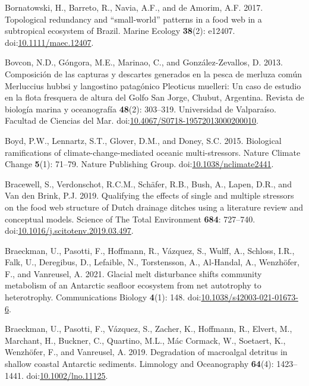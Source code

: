 \documentclass[
]{article}
\newlength{\cslhangindent}
\newenvironment{CSLReferences}[2] %
 {\begin{list}{}{%
  \setlength{\itemindent}{0pt}
  \setlength{\leftmargin}{0pt}
  \setlength{\parsep}{0pt}
  \ifodd #1
   \setlength{\leftmargin}{\cslhangindent}
   \setlength{\itemindent}{-1\cslhangindent}
  \fi
  \setlength{\itemsep}{#2\baselineskip}}}
 {\end{list}}
\begin{document}
\begin{CSLReferences}{1}{0}
Bornatowski, H., Barreto, R., Navia, A.F., and de Amorim, A.F. 2017.
Topological redundancy and {``small-world''} patterns in a food web in a
subtropical ecosystem of {Brazil}. Marine Ecology \textbf{38}(2):
e12407.
doi:\href{https://doi.org/10.1111/maec.12407}{10.1111/maec.12407}.

Bovcon, N.D., Góngora, M.E., Marinao, C., and González-Zevallos, D.
2013. Composici{ó}n de las capturas y descartes generados en la pesca de
merluza com{ú}n {Merluccius} hubbsi y langostino patag{ó}nico
{Pleoticus} muelleri: Un caso de estudio en la flota fresquera de altura
del {Golfo San Jorge}, {Chubut}, {Argentina}. Revista de biolog{í}a
marina y oceanograf{í}a \textbf{48}(2): 303--319. Universidad de
Valpara{í}so. Facultad de Ciencias del Mar.
doi:\href{https://doi.org/10.4067/S0718-19572013000200010}{10.4067/S0718-19572013000200010}.

Boyd, P.W., Lennartz, S.T., Glover, D.M., and Doney, S.C. 2015.
Biological ramifications of climate-change-mediated oceanic
multi-stressors. Nature Climate Change \textbf{5}(1): 71--79. Nature
Publishing Group.
doi:\href{https://doi.org/10.1038/nclimate2441}{10.1038/nclimate2441}.

Bracewell, S., Verdonschot, R.C.M., Schäfer, R.B., Bush, A., Lapen,
D.R., and Van den Brink, P.J. 2019. Qualifying the effects of single and
multiple stressors on the food web structure of {Dutch} drainage ditches
using a literature review and conceptual models. Science of The Total
Environment \textbf{684}: 727--740.
doi:\href{https://doi.org/10.1016/j.scitotenv.2019.03.497}{10.1016/j.scitotenv.2019.03.497}.

Braeckman, U., Pasotti, F., Hoffmann, R., Vázquez, S., Wulff, A.,
Schloss, I.R., Falk, U., Deregibus, D., Lefaible, N., Torstensson, A.,
Al-Handal, A., Wenzhöfer, F., and Vanreusel, A. 2021. Glacial melt
disturbance shifts community metabolism of an {Antarctic} seafloor
ecosystem from net autotrophy to heterotrophy. Communications Biology
\textbf{4}(1): 148.
doi:\href{https://doi.org/10.1038/s42003-021-01673-6}{10.1038/s42003-021-01673-6}.

Braeckman, U., Pasotti, F., Vázquez, S., Zacher, K., Hoffmann, R.,
Elvert, M., Marchant, H., Buckner, C., Quartino, M.L., Mác Cormack, W.,
Soetaert, K., Wenzhöfer, F., and Vanreusel, A. 2019. Degradation of
macroalgal detritus in shallow coastal {Antarctic} sediments. Limnology
and Oceanography \textbf{64}(4): 1423--1441.
doi:\href{https://doi.org/10.1002/lno.11125}{10.1002/lno.11125}.


\end{CSLReferences}
\end{document}
